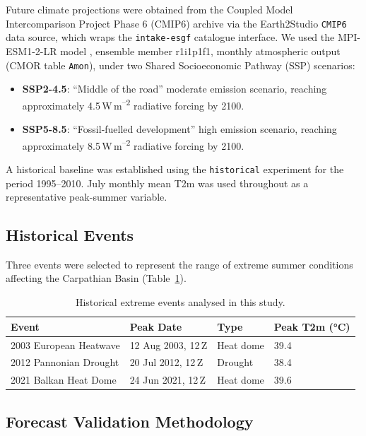 \documentclass[12pt,a4paper]{article}
\begin{document}
Future climate projections were obtained from the Coupled Model
Intercomparison Project Phase 6 (CMIP6) archive \citep{eyring2016overview}
via the Earth2Studio \texttt{CMIP6} data source, which wraps the
\texttt{intake-esgf} catalogue interface. We used the MPI-ESM1-2-LR model
\citep{mpi2019}, ensemble member r1i1p1f1, monthly atmospheric output
(CMOR table \texttt{Amon}), under two Shared Socioeconomic Pathway (SSP)
scenarios:

\begin{itemize}
  \item \textbf{SSP2-4.5}: ``Middle of the road'' moderate emission
        scenario, reaching approximately 4.5\,W\,m\textsuperscript{--2}
        radiative forcing by 2100.
  \item \textbf{SSP5-8.5}: ``Fossil-fuelled development'' high emission
        scenario, reaching approximately 8.5\,W\,m\textsuperscript{--2}
        radiative forcing by 2100.
\end{itemize}

A historical baseline was established using the \texttt{historical}
experiment for the period 1995--2010. July monthly mean T2m was used
throughout as a representative peak-summer variable.

\subsection{Historical Events}

Three events were selected to represent the range of extreme summer
conditions affecting the Carpathian Basin (Table~\ref{tab:events}).

\begin{table}[H]
  \centering
  \caption{Historical extreme events analysed in this study.}
  \label{tab:events}
  \begin{tabular}{llll}
    \toprule
    \textbf{Event} & \textbf{Peak Date} & \textbf{Type} & \textbf{Peak T2m (°C)} \\
    \midrule
    2003 European Heatwave  & 12 Aug 2003, 12\,Z & Heat dome & 39.4 \\
    2012 Pannonian Drought  & 20 Jul 2012, 12\,Z & Drought   & 38.4 \\
    2021 Balkan Heat Dome   & 24 Jun 2021, 12\,Z & Heat dome & 39.6 \\
    \bottomrule
  \end{tabular}
\end{table}

\subsection{Forecast Validation Methodology}
\end{document}
